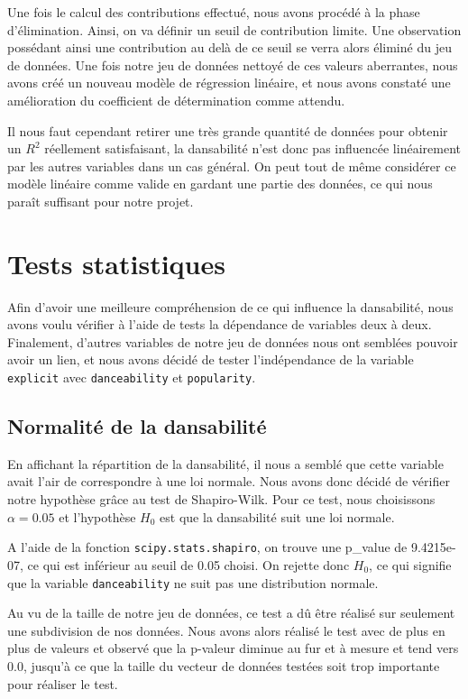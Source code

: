 \documentclass[a4paper, 12pt]{report}
\newcommand{\pythoninline}[1]{\texttt{#1}}
\begin{document}
Une fois le calcul des contributions effectué, nous avons procédé à la phase d'élimination. Ainsi, on va définir un seuil de contribution limite. Une observation possédant ainsi une contribution au delà de ce seuil se verra alors éliminé du jeu de données. Une fois notre jeu de données nettoyé de ces valeurs aberrantes, nous avons créé un nouveau modèle de régression linéaire, et nous avons constaté une amélioration du coefficient de détermination comme attendu.

Il nous faut cependant retirer une très grande quantité de données pour obtenir un $R^2$ réellement satisfaisant, la dansabilité n'est donc pas influencée linéairement par les autres variables dans un cas général. On peut tout de même considérer ce modèle linéaire comme valide en gardant une partie des données, ce qui nous paraît suffisant pour notre projet. 

\section{Tests statistiques}

Afin d'avoir une meilleure compréhension de ce qui influence la dansabilité, nous avons voulu vérifier à l'aide de tests la dépendance de variables deux à deux. Finalement, d'autres variables de notre jeu de données nous ont semblées pouvoir avoir un lien, et nous avons décidé de tester l'indépendance de la variable \verb|explicit| avec \verb|danceability| et \verb|popularity|.

\subsection{Normalité de la dansabilité}

En affichant la répartition de la dansabilité, il nous a semblé que cette variable avait l'air de correspondre à une loi normale. Nous avons donc décidé de vérifier notre hypothèse grâce au test de Shapiro-Wilk. Pour ce test, nous choisissons $\alpha = 0.05$ et l'hypothèse $H_0$ est que la dansabilité suit une loi normale. 

A l'aide de la fonction \pythoninline{scipy.stats.shapiro}, on trouve une p\_value de 9.4215e-07, ce qui est inférieur au seuil de 0.05 choisi. On rejette donc $H_0$, ce qui signifie que la variable \verb|danceability| ne suit pas une distribution normale.

Au vu de la taille de notre jeu de données, ce test a dû être réalisé sur seulement une subdivision  de nos données. Nous avons alors réalisé le test avec de plus en plus de valeurs et observé que la p-valeur diminue au fur et à mesure et tend vers 0.0, jusqu'à ce que la taille du vecteur de données testées soit trop importante pour réaliser le test. 
\end{document}
